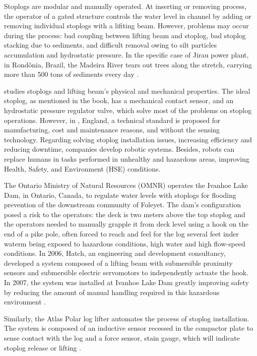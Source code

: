 Stoplogs are modular and manually operated. At inserting or removing process,
the operator of a gated structure controls the water
level in channel by adding or removing individual stoplogs with a lifiting beam.
However, problems may occur during the process: bad coupling between lifting
beam and stoplog, bad stoplog stacking due to sediments, and difficult removal
owing to silt particles accumulation and hydrostatic pressure. In the specific
case of Jirau power plant, in Rond{\^o}nia, Brazil, the Madeira River tears out
trees along the stretch, carrying more than 500 tons of sediments every day
\citep{amazon}.

\citet{jack} studies stoplogs and lifting beam's physical and
mechanical properties. The ideal stoplog, as mentioned in the book, has a
mechanical contact sensor, and an hydrostatic pressure regulator valve, which
solve most of the problems on stoplog operations. However, in \cite{pinc},
England, a technical standard is proposed for
manufacturing, cost and maintenance reasons, and without the sensing technology.
Regarding solving stoplog installation issues, increasing efficiency and
reducing downtime, companies develop robotic systems. Besides, robots can replace humans in tasks
performed in unhealthy and hazardous areas, improving Health,
Safety, and Environment (HSE) conditions.

The Ontario Ministry of Natural Resources (OMNR) operates the Ivanhoe Lake Dam,
in Ontario, Canada, to regulate water levels with stoplogs for flooding
prevention of the downstream community of Foleyet. The dam's
configuration posed a risk to the operators: the deck is two meters above the
top stoplog and the operators needed to
manually grapple it from deck level using a hook on the end of
a pike pole, often forced to reach and feel for the log several feet inder
waterm being exposed to hazardous conditions, high water and high flow-speed
conditions. In 2006, Hatch, an engineering and development consultancy,
developed a system composed of a lifting beam with submersible proximity sensors
and submersible electric servomotors to independently actuate the hook. In 2007,
the system was installed at Ivanhoe Lake Dam greatly improving safety by
reducing the amount of manual handling required in this hazardous environment
\citep{hatch}.

Similarly, the Atlas Polar log lifter automates the process of stoplog
installation. The system is composed of an inductive sensor
recessed in the compactor plate to sense contact with the log and a force
sensor, stain gauge, which will indicate stoplog release or lifting
\citep{atlas}.  


